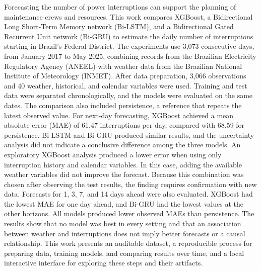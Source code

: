 Forecasting the number of power interruptions can support the planning of maintenance crews and resources. This work compares XGBoost, a Bidirectional Long Short-Term Memory network (Bi-LSTM), and a Bidirectional Gated Recurrent Unit network (Bi-GRU) to estimate the daily number of interruptions starting in Brazil's Federal District. The experiments use 3,073 consecutive days, from January 2017 to May 2025, combining records from the Brazilian Electricity Regulatory Agency (ANEEL) with weather data from the Brazilian National Institute of Meteorology (INMET). After data preparation, 3,066 observations and 40 weather, historical, and calendar variables were used. Training and test data were separated chronologically, and the models were evaluated on the same dates. The comparison also included persistence, a reference that repeats the latest observed value. For next-day forecasting, XGBoost achieved a mean absolute error (MAE) of 61.47 interruptions per day, compared with 68.59 for persistence. Bi-LSTM and Bi-GRU produced similar results, and the uncertainty analysis did not indicate a conclusive difference among the three models. An exploratory XGBoost analysis produced a lower error when using only interruption history and calendar variables. In this case, adding the available weather variables did not improve the forecast. Because this combination was chosen after observing the test results, the finding requires confirmation with new data. Forecasts for 1, 3, 7, and 14 days ahead were also evaluated. XGBoost had the lowest MAE for one day ahead, and Bi-GRU had the lowest values at the other horizons. All models produced lower observed MAEs than persistence. The results show that no model was best in every setting and that an association between weather and interruptions does not imply better forecasts or a causal relationship. This work presents an auditable dataset, a reproducible process for preparing data, training models, and comparing results over time, and a local interactive interface for exploring these steps and their artifacts.
